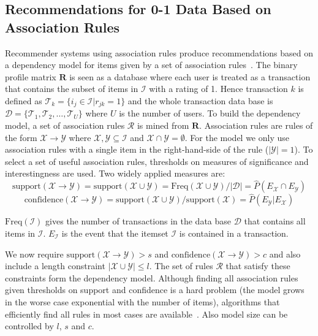 \documentclass[nojss]{jss}
\newcommand{\set}[1]{\mathcal{#1}}
\newcommand{\mat}[1]{{\mathbf{#1}}}
\begin{document}
\subsection{Recommendations for 0-1 Data Based on Association Rules}
\label{sec:AR}
Recommender systems using association rules
produce recommendations based on a dependency model for items 
given by a set of association 
rules~\citep{Fu:2000,Mobasher:2001,Geyer-Schulz:2002,Lin:2002,Demiriz:2004}. 
The binary profile matrix $\mat{R}$ is seen as a database 
where each user is treated as a transaction that contains
the subset of items in $\set{I}$ with a rating of 1.
Hence transaction $k$ is defined as 
$\set{T}_k = \{i_j \in \set{I} | r_{jk} = 1\}$ and
the whole transaction data base is 
$\set{D} = \{\set{T}_1, \set{T}_2, \ldots, \set{T}_U\}$ where $U$ is the number of users.
To build the dependency model, 
a set of association rules $\set{R}$ is mined from
$\mat{R}$. Association rules are rules of the form
$\set{X} \rightarrow \set{Y}$  where $\set{X}, \set{Y} \subseteq \set{I}$
and $\set{X} \cap \set{Y} = \emptyset$.
For the model we only use association rules with a single item in
the right-hand-side of the rule ($|\set{Y}| = 1$).
To select a set of useful association rules, 
thresholds on measures of significance and interestingness are used. Two widely applied measures are:
\begin{equation*}
\mathrm{support}(\set{X} \rightarrow \set{Y}) = 
\mathrm{support}(\set{X} \cup \set{Y}) = 
\mathrm{Freq}(\set{X} \cup \set{Y}) / |\set{D}| = \hat{P}(E_\set{X} \cap E_\set{Y})
\end{equation*}
\begin{equation*}
\mathrm{confidence}(\set{X} \rightarrow \set{Y}) = \mathrm{support}(\set{X} \cup \set{Y}) / \mathrm{support}(\set{X}) = \hat{P}(E_\set{Y}|E_\set{X}) 
\end{equation*}

$\mathrm{Freq}(\set{I})$ gives the number of transactions
in the data base $\set{D}$ that contains all items in $\set{I}$.
$E_\set{I}$ is the event that the itemset $\set{I}$ is contained in a transaction.

We now require $\mathrm{support}(\set{X} \rightarrow \set{Y}) > s$ and 
$\mathrm{confidence}(\set{X} \rightarrow \set{Y}) > c$ 
and also include a length constraint $|\set{X} \cup \set{Y}|\leq l$.
The set of rules $\set{R}$ that satisfy these constraints form the dependency
model. Although finding all association rules given thresholds
on support and confidence is a hard problem (the model grows in the 
worse case exponential with the number of items), algorithms that efficiently
find all rules in most cases are 
available~\citep[e.g.,][]{arules:Agrawal:1994,arules:Zaki:2000,arules:Han:2004}. Also model size can be controlled by $l$, $s$ and $c$.
\end{document}
